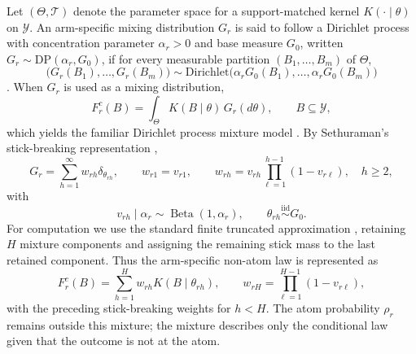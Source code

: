 \documentclass[11pt]{article}
\DeclareMathOperator*{\Beta}{Beta}
\begin{document}
Let $(\Theta,\mathcal{T})$ denote the parameter space for a support-matched kernel $K(\cdot \mid \theta)$ on $\mathcal{Y}$. An arm-specific mixing distribution $G_r$ is said to follow a Dirichlet process with concentration parameter $\alpha_r > 0$ and base measure $G_0$, written $G_r \sim \mathrm{DP}(\alpha_r,G_0)$, if for every measurable partition $(B_1,\ldots,B_m)$ of $\Theta$,
\[
  \bigl(G_r(B_1),\ldots,G_r(B_m)\bigr)
  \sim
  \mathrm{Dirichlet}\bigl(\alpha_r G_0(B_1),\ldots,\alpha_r G_0(B_m)\bigr)
\]
\citep{ferguson1973bayesian}. When $G_r$ is used as a mixing distribution,
\[
  F_r^c(B) = \int_{\Theta} K(B \mid \theta)\,G_r(d\theta),
  \qquad B \subseteq \mathcal{Y},
\]
which yields the familiar Dirichlet process mixture model \citep{antoniak1974mixtures}. By Sethuraman's stick-breaking representation \citep{sethuraman1994constructive},
\[
  G_r = \sum_{h=1}^{\infty} w_{rh}\delta_{\theta_{rh}},
  \qquad
  w_{r1} = v_{r1},
  \qquad
  w_{rh} = v_{rh}\prod_{\ell=1}^{h-1}(1-v_{r\ell}),
  \quad h \geq 2,
\]
with
\[
  v_{rh} \mid \alpha_r \sim \Beta(1,\alpha_r),
  \qquad
  \theta_{rh} \stackrel{\mathrm{iid}}{\sim} G_0.
\]
For computation we use the standard finite truncated approximation \citep{ishwaran2001gibbs}, retaining $H$ mixture components and assigning the remaining stick mass to the last retained component. Thus the arm-specific non-atom law is represented as
\[
  F_r^c(B)
  =
  \sum_{h=1}^{H}w_{rh}K(B\mid\theta_{rh}),
  \qquad
  w_{rH}=\prod_{\ell=1}^{H-1}(1-v_{r\ell}),
\]
with the preceding stick-breaking weights for $h<H$. The atom probability $\rho_r$ remains outside this mixture; the mixture describes only the conditional law given that the outcome is not at the atom.
\end{document}

